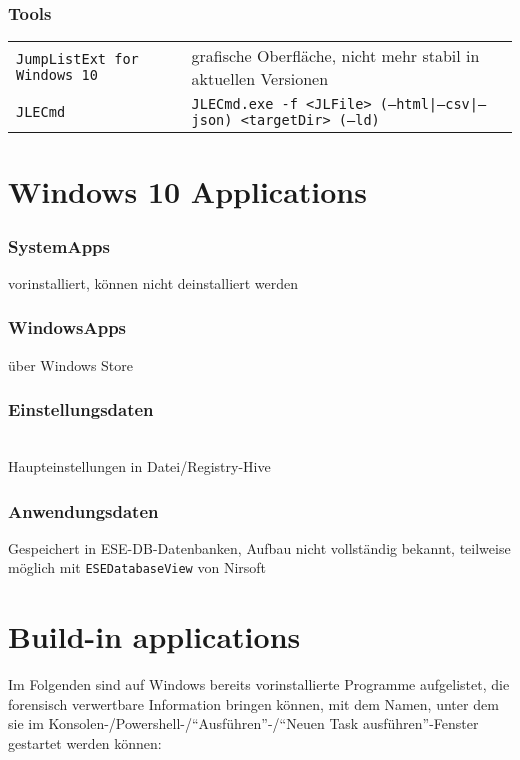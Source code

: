 \subsubsection{Tools}
\begin{tabular}{@{}p{\the\MyLen}%
		@{}p{\linewidth-\the\MyLen}@{}}
	\texttt{JumpListExt for Windows 10} & grafische Oberfläche, nicht mehr stabil in aktuellen Versionen\\
	\texttt{JLECmd} & \texttt{JLECmd.exe -f <JLFile> (--html|--csv|--json) <targetDir> (--ld)}\\
\end{tabular}

\section{Windows 10 Applications}
\subsubsection{SystemApps}
vorinstalliert, können nicht deinstalliert werden\\
\subsubsection{WindowsApps}
über Windows Store
\subsubsection{Einstellungsdaten}
\\
Haupteinstellungen in Datei/Registry-Hive 
\subsubsection{Anwendungsdaten}
Gespeichert in ESE-DB-Datenbanken, Aufbau nicht vollständig bekannt, teilweise möglich mit \texttt{ESEDatabaseView} von Nirsoft

\section{Build-in applications}
Im Folgenden sind auf Windows bereits vorinstallierte Programme aufgelistet, die forensisch verwertbare Information bringen können, mit dem Namen, unter dem sie im Konsolen-/Powershell-/\enquote{Ausführen}-/\enquote{Neuen Task ausführen}-Fenster gestartet werden können:

